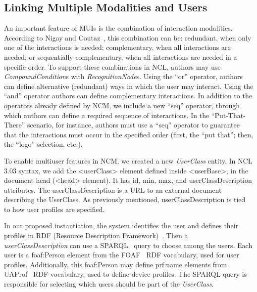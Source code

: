 \subsection{Linking Multiple Modalities and Users}
\label{sec:instantiations:link}

An important feature of MUIs is the combination of interaction modalities.
According to Nigay and Coutaz~\cite{coutaz_four_1995}, this combination can be:
redundant, when only one of the interactions is needed; complementary, when all
interactions are needed; or sequentially complementary, when all interactions
are needed in a specific order. To support these combinations in NCL, authors
may use \textit{CompoundCondition}s with \textit{RecognitionNode}s. Using the
“or” operator, authors can define alternative (redundant) ways in which the user
may interact. Using the “and” operator authors can define complementary
interactions. In addition to the operators already defined by NCM, we include a
new “seq” operator, through which authors can define a required sequence of
interactions. In the “Put-That-There” scenario, for instance, authors must use a
“seq” operator to guarantee that the interactions must occur in the specified
order (first, the “put that”; then, the “logo” selection, etc.).

To enable multiuser features in NCM, we created a new \textit{UserClass} entity.
In NCL 3.03 syntax, we add the <userClass> element defined inside <userBase>, in
the document head (<head> element). It has id, min, max, and
userClassDescription attributes. The userClassDescription is a URL to an
external document describing the UserClass. As previously mentioned,
userClassDescription is tied to how user profiles are specified.

In our proposed instantiation, the system identifies the user and defines their
profiles in RDF (Resource Description Framework)~\cite{w3c_rdf/xml_2014}. Then a \textit{userClassDescription} can use a SPARQL~\cite{w3c_sparql_2008} query to
choose among the users. Each user is a foaf:Person element from the
FOAF~\cite{brickley_foaf_2014} RDF vocabulary, used for user profiles.
Additionally, this foaf:Person may define prf:name elements from
UAProf~\cite{openmobilealliance_wag_2001} RDF vocabulary, used to define device
profiles. The SPARQL query is responsible for selecting which users should be
part of the \textit{UserClass}.

